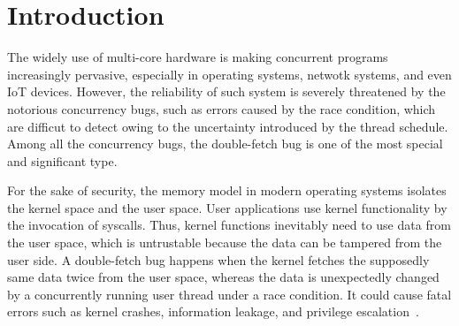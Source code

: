 \documentclass[10pt]{llncs}
\begin{document}
\section{Introduction}%
\label{intro}


The widely use of multi-core hardware is making concurrent programs increasingly pervasive, 
especially in operating systems, netwotk systems, and even IoT devices. However, 
the reliability of such system is severely threatened by the notorious concurrency bugs, 
such as errors caused by the race condition, which are difficut to detect owing to the 
uncertainty introduced by the thread schedule. Among all the concurrency bugs, the double-fetch 
bug is one of the most special and significant type.


For the sake of security, the memory model in modern operating systems isolates the kernel space and 
the user space. User applications use kernel functionality by the invocation of syscalls. 
Thus, kernel functions inevitably need to use data from the user space, which is untrustable 
because the data can be tampered from the user side. A double-fetch bug happens when the 
kernel fetches the supposedly same data twice from the user space, whereas the data is 
unexpectedly changed by a concurrently running user thread under a race condition. 
It could cause fatal errors such as kernel crashes, information leakage, and privilege escalation~\cite{Wang2017A}. 
\end{document}
